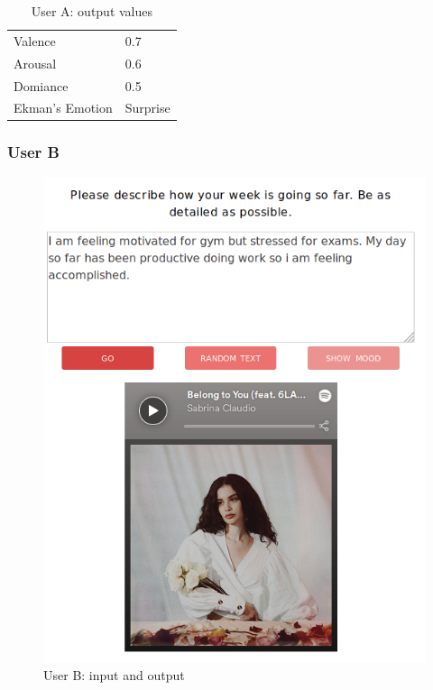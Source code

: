 \begin{table}[h]
\centering
\caption{User A: output values}
\begin{tabular}{|l|l|}
\hline
 Valence &  0.7\\
 Arousal &  0.6\\
 Domiance &  0.5\\
 Ekman's Emotion &  Surprise\\ \hline
\end{tabular}
\label{user:1values}
\end{table}

\pagebreak

\subsubsection{User B}

\begin{figure}[h]
\centering
\includegraphics[scale=0.4]{implementation/jana.png}
\caption{User B: input and output}
\label{user:2}
\end{figure}

